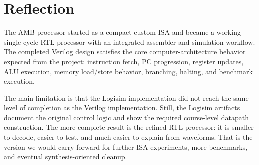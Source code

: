\documentclass[12pt,a4paper]{article}
\begin{document}
\section{Reflection}

The AMB processor started as a compact custom ISA and became a working single-cycle RTL processor with an integrated assembler and simulation workflow. The completed Verilog design satisfies the core computer-architecture behavior expected from the project: instruction fetch, PC progression, register updates, ALU execution, memory load/store behavior, branching, halting, and benchmark execution.

The main limitation is that the Logisim implementation did not reach the same level of completion as the Verilog implementation. Still, the Logisim artifacts document the original control logic and show the required course-level datapath construction. The more complete result is the refined RTL processor: it is smaller to decode, easier to test, and much easier to explain from waveforms. That is the version we would carry forward for further ISA experiments, more benchmarks, and eventual synthesis-oriented cleanup.
\end{document}
